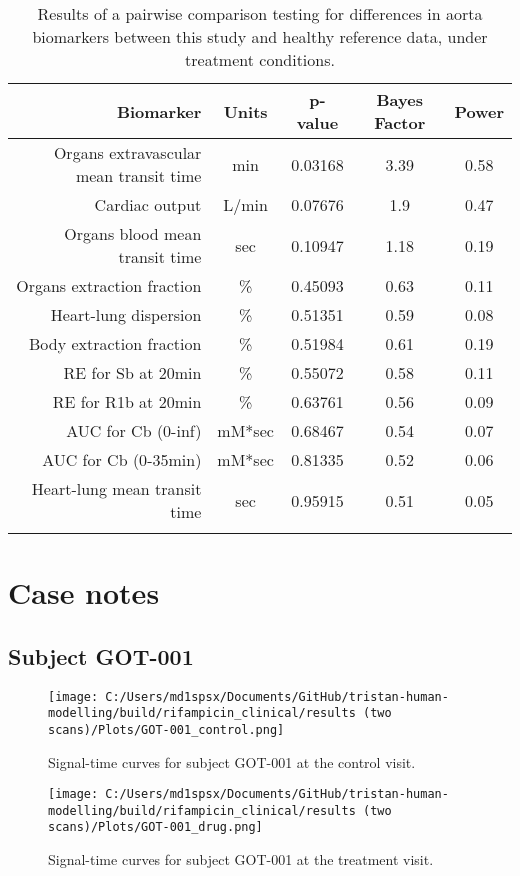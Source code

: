 \documentclass{epflreport}%
\begin{document}
\begin{longtable}{rcccc}%
\hline%
Biomarker&Units&p{-}value&Bayes Factor&Power\\%
\hline%
Organs extravascular mean transit time&min&0.03168&3.39&0.58\\%
Cardiac output&L/min&0.07676&1.9&0.47\\%
Organs blood mean transit time&sec&0.10947&1.18&0.19\\%
Organs extraction fraction&\%&0.45093&0.63&0.11\\%
Heart{-}lung dispersion&\%&0.51351&0.59&0.08\\%
Body extraction fraction&\%&0.51984&0.61&0.19\\%
RE for Sb at 20min&\%&0.55072&0.58&0.11\\%
RE for R1b at 20min&\%&0.63761&0.56&0.09\\%
AUC for Cb (0{-}inf)&mM*sec&0.68467&0.54&0.07\\%
AUC for Cb (0{-}35min)&mM*sec&0.81335&0.52&0.06\\%
Heart{-}lung mean transit time&sec&0.95915&0.51&0.05\\%
\hline%
\caption{Results of a pairwise comparison testing for differences in aorta biomarkers between this study and healthy reference data, under treatment conditions.} \\%
\end{longtable}%
\clearpage%
\section{Case notes}%
\label{sec:Casenotes}%

%
\subsection{Subject GOT{-}001}%
\label{subsec:SubjectGOT{-}001}%

%


\begin{figure}[h!]%
\centering%
\texttt{[image: C:/Users/md1spsx/Documents/GitHub/tristan-human-modelling/build/rifampicin\_clinical/results (two scans)/Plots/GOT-001\_control.png]}%
\caption{Signal{-}time curves for subject GOT{-}001 at the control visit.}%
\end{figure}

%


\begin{figure}[h!]%
\centering%
\texttt{[image: C:/Users/md1spsx/Documents/GitHub/tristan-human-modelling/build/rifampicin\_clinical/results (two scans)/Plots/GOT-001\_drug.png]}%
\caption{Signal{-}time curves for subject GOT{-}001 at the treatment visit.}%
\end{figure}
\end{document}
